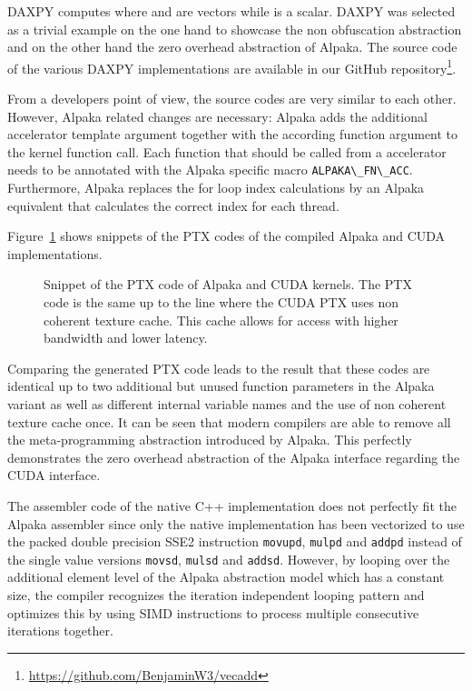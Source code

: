 \documentclass[10pt, twocolumn]{article}
\newcommand{\alpaka}{Alpaka\xspace}
\newcommand{\cuda}{{CUDA}\xspace}
\newcommand{\simd}{{SIMD}\xspace}
\newcommand{\github}{{GitHub}\xspace}
\newcommand{\cpp}[1]{\lstinline[identifierstyle=\color{black}\bfseries]{#1}}
\begin{document}
DAXPY computes  where  and  are vectors while  is a scalar.
DAXPY was selected as a trivial example on the one hand to showcase the non obfuscation abstraction and on the other hand the zero overhead abstraction of \alpaka.
The source code of the various DAXPY implementations are available in our \github repository\footnote{\url{https://github.com/BenjaminW3/vecadd}}.

From a developers point of view, the source codes are very similar to each other.
However, \alpaka related changes are necessary:
\alpaka adds the additional accelerator template argument together with the according function argument to the kernel function call.
Each function that should be called from a accelerator needs to be annotated with the \alpaka specific macro \cpp{ALPAKA\_FN\_ACC}.
Furthermore, \alpaka replaces the for loop index calculations by an \alpaka equivalent that calculates the correct index for each thread.





Figure~\ref{fig:ptx} shows snippets of the PTX codes of the compiled \alpaka and \cuda implementations.

\begin{figure}[tb]
  \centerline
      {}
          \caption{Snippet of the PTX code of \alpaka and \cuda kernels. The PTX code is the same up to the line where the \cuda PTX uses non coherent texture cache. This cache allows for access with higher bandwidth and lower latency.}
          \label{fig:ptx}
          \vspace{-1em}
\end{figure}

Comparing the generated PTX code leads to the result that these codes are identical up to two additional but unused function parameters in the \alpaka variant as well as different internal variable names and the use of non coherent texture cache once.
It can be seen that modern compilers are able to remove all the meta-programming abstraction introduced by \alpaka.
This perfectly demonstrates the zero overhead abstraction of the \alpaka interface regarding the \cuda interface.

The assembler code of the native C++ implementation does not perfectly fit the \alpaka assembler since only the native implementation has been vectorized to use the packed double precision SSE2 instruction \cpp{movupd}, \cpp{mulpd} and \cpp{addpd} instead of the single value versions \cpp{movsd}, \cpp{mulsd} and \cpp{addsd}.
However, by looping over the additional element level of the \alpaka abstraction model which has a constant size, the compiler recognizes the iteration independent looping pattern and optimizes this by using \simd instructions to process multiple consecutive iterations together.
\end{document}
